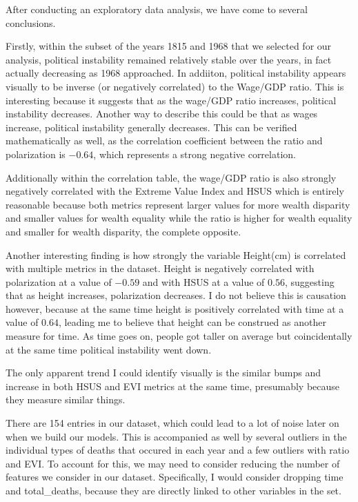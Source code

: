 \documentclass[
  letterpaper,
  DIV=11,
  numbers=noendperiod]{scrartcl}
\begin{document}
After conducting an exploratory data analysis, we have come to several
conclusions.

Firstly, within the subset of the years 1815 and 1968 that we selected
for our analysis, political instability remained relatively stable over
the years, in fact actually decreasing as 1968 approached. In addiiton,
political instability appears visually to be inverse (or negatively
correlated) to the Wage/GDP ratio. This is interesting because it
suggests that as the wage/GDP ratio increases, political instability
decreases. Another way to describe this could be that as wages increase,
political instability generally decreases. This can be verified
mathematically as well, as the correlation coefficient between the ratio
and polarization is \(-0.64\), which represents a strong negative
correlation.

Additionally within the correlation table, the wage/GDP ratio is also
strongly negatively correlated with the Extreme Value Index and HSUS
which is entirely reasonable because both metrics represent larger
values for more wealth disparity and smaller values for wealth equality
while the ratio is higher for wealth equality and smaller for wealth
disparity, the complete opposite.

Another interesting finding is how strongly the variable Height(cm) is
correlated with multiple metrics in the dataset. Height is negatively
correlated with polarization at a value of \(-0.59\) and with HSUS at a
value of \(0.56\), suggesting that as height increases, polarization
decreases. I do not believe this is causation however, because at the
same time height is positively correlated with time at a value of
\(0.64\), leading me to believe that height can be construed as another
measure for time. As time goes on, people got taller on average but
coincidentally at the same time political instability went down.

The only apparent trend I could identify visually is the similar bumps
and increase in both HSUS and EVI metrics at the same time, presumably
because they measure similar things.

There are 154 entries in our dataset, which could lead to a lot of noise
later on when we build our models. This is accompanied as well by
several outliers in the individual types of deaths that occured in each
year and a few outliers with ratio and EVI. To account for this, we may
need to consider reducing the number of features we consider in our
dataset. Specifically, I would consider dropping time and total\_deaths,
because they are directly linked to other variables in the set.
\end{document}
